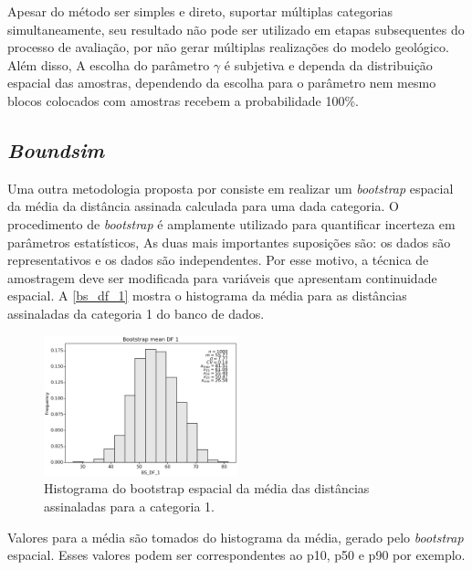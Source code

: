 Apesar do método ser simples e direto, suportar múltiplas categorias simultaneamente, seu resultado não pode ser utilizado em etapas subsequentes do processo de  avaliação, por não gerar múltiplas realizações do modelo geológico. Além disso, A escolha do parâmetro $\gamma$ é subjetiva e dependa da distribuição espacial das amostras, dependendo da escolha para o parâmetro nem mesmo blocos colocados com amostras recebem a probabilidade 100\%. 

\subsection{\textit{Boundsim}}

Uma outra metodologia proposta por  consiste em realizar um \textit{bootstrap} espacial \cite{deutsh_spatial_bootstrap} da média da distância assinada calculada para uma dada categoria. O procedimento de \textit{bootstrap} é amplamente utilizado para quantificar incerteza em parâmetros estatísticos, As duas mais importantes suposições são: os dados são representativos e os dados são independentes. Por esse motivo, a técnica de amostragem deve ser modificada para variáveis que apresentam continuidade espacial. A \autoref{bs_df_1} mostra o histograma da média para as distâncias assinaladas da categoria 1 do banco de dados. 

\begin{figure}[H]
	\caption{\label{bs_df_1}Histograma do bootstrap espacial da média das distâncias assinaladas para a categoria 1.}
	\begin{center}
		\includegraphics[width=0.5\textwidth]{capitulo_2/BS_DF_1.png}
	\end{center}
\end{figure}

Valores para a média são tomados do histograma da média, gerado pelo \textit{bootstrap} espacial. Esses valores podem ser correspondentes ao p10, p50 e p90 por exemplo.

